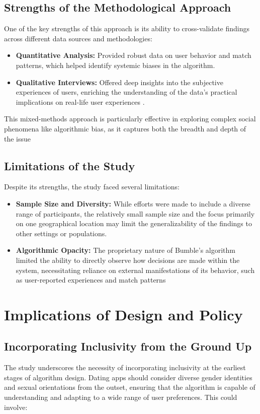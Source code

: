 \subsection{Strengths of the Methodological Approach}
One of the key strengths of this approach is its ability to cross-validate findings across different data sources and methodologies:

\begin{itemize}
    \item \textbf{Quantitative Analysis:} Provided robust data on user behavior and match patterns, which helped identify systemic biases in the algorithm. 
    \item \textbf{Qualitative Interviews:} Offered deep insights into the subjective experiences of users, enriching the understanding of the data's practical implications on real-life user experiences \cite{Kalra_Gupta_Varghese_Rangaswamy_2023}.
\end{itemize}
This mixed-methods approach is particularly effective in exploring complex social phenomena like algorithmic bias, as it captures both the breadth and depth of the issue \cite{Creswell_2009}

\subsection{Limitations of the Study}
Despite its strengths, the study faced several limitations:

\begin{itemize}
    \item \textbf{Sample Size and Diversity:} While efforts were made to include a diverse range of participants, the relatively small sample size and the focus primarily on one geographical location may limit the generalizability of the findings to other settings or populations.
    \item \textbf{Algorithmic Opacity:} The proprietary nature of Bumble’s algorithm limited the ability to directly observe how decisions are made within the system, necessitating reliance on external manifestations of its behavior, such as user-reported experiences and match patterns 
\end{itemize}

\section{Implications of Design and Policy}
\subsection{Incorporating Inclusivity from the Ground Up}
The study underscores the necessity of incorporating inclusivity at the earliest stages of algorithm design. Dating apps should consider diverse gender identities and sexual orientations from the outset, ensuring that the algorithm is capable of understanding and adapting to a wide range of user preferences. This could involve:

